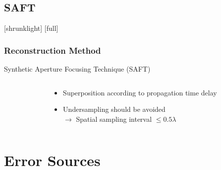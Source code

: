 \documentclass[12pt,compress,aspectratio=169]{beamer} %
\begin{document}
\subsection{SAFT}
[shrunklight]
[full]
\begin{frame}[t]
	\frametitle{Reconstruction Method} 
	Synthetic Aperture Focusing Technique (SAFT)
	\begin{columns}[t]	
	\begin{column}{0.52\textwidth}
	\begin{center}
	\end{center}
	\end{column}
	
	\begin{column}{0.48\textwidth}
	\begin{center}
		\begin{itemize}
		\item Superposition according to propagation time delay
		\item Undersampling should be avoided\\					 
				$\rightarrow$ Spatial sampling interval $\leq 0.5 \lambda$\\
		\end{itemize}
	\end{center}
	\end{column}	
	\end{columns}	
		
\end{frame}

\section{Error Sources}
\end{document}
